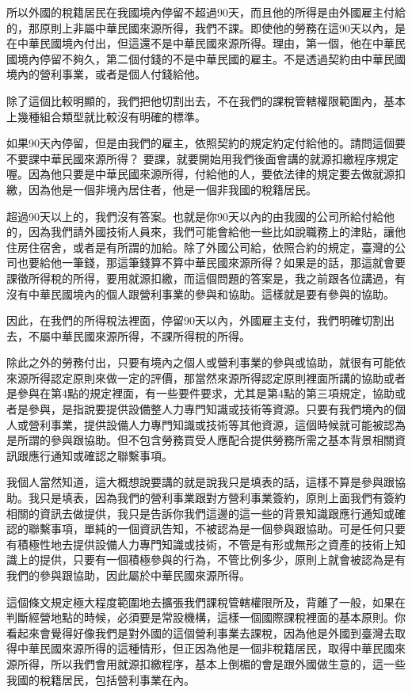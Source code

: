 \documentclass[oneside,sub3section]{ctexbook}
\begin{document}
所以外國的稅籍居民在我國境內停留不超過90天，而且他的所得是由外國雇主付給的，那原則上非屬中華民國來源所得，我們不課。即使他的勞務在這90天以內，是在中華民國境內付出，但這還不是中華民國來源所得。理由，第一個，他在中華民國境內停留不夠久，第二個付錢的不是中華民國的雇主。不是透過契約由中華民國境內的營利事業，或者是個人付錢給他。

除了這個比較明顯的，我們把他切割出去，不在我們的課稅管轄權限範圍內，基本上幾種組合類型就比較沒有明確的標準。

如果90天內停留，但是由我們的雇主，依照契約的規定約定付給他的。請問這個要不要課中華民國來源所得？ 要課，就要開始用我們後面會講的就源扣繳程序規定喔。因為他只要是中華民國來源所得，付給他的人，要依法律的規定要去做就源扣繳，因為他是一個非境內居住者，他是一個非我國的稅籍居民。

超過90天以上的，我們沒有答案。也就是你90天以內的由我國的公司所給付給他的，因為我們請外國技術人員來，我們可能會給他一些比如說職務上的津貼，讓他住房住宿舍，或者是有所謂的加給。除了外國公司給，依照合約的規定，臺灣的公司也要給他一筆錢，那這筆錢算不算中華民國來源所得？如果是的話，那這就會要課徵所得稅的所得，要用就源扣繳，而這個問題的答案是，我之前跟各位講過，有沒有中華民國境內的個人跟營利事業的參與和協助。這樣就是要有參與的協助。

因此，在我們的所得稅法裡面，停留90天以內，外國雇主支付，我們明確切割出去，不屬中華民國來源所得，不課所得稅的所得。

除此之外的勞務付出，只要有境內之個人或營利事業的參與或協助，就很有可能依來源所得認定原則來做一定的評價，那當然來源所得認定原則裡面所講的協助或者是參與在第4點的規定裡面，有一些要件要求，尤其是第4點的第三項規定，協助或者是參與，是指說要提供設備整人力專門知識或技術等資源。只要有我們境內的個人或營利事業，提供設備人力專門知識或技術等其他資源，這個時候就可能被認為是所謂的參與跟協助。但不包含勞務買受人應配合提供勞務所需之基本背景相關資訊跟應行通知或確認之聯繫事項。

我個人當然知道，這大概想說要講的就是說我只是填表的話，這樣不算是參與跟協助。我只是填表，因為我們的營利事業跟對方營利事業簽約，原則上面我們有簽約相關的資訊去做提供，我只是告訴你我們這邊的這一些的背景知識跟應行通知或確認的聯繫事項，單純的一個資訊告知，不被認為是一個參與跟協助。可是任何只要有積極性地去提供設備人力專門知識或技術，不管是有形或無形之資產的技術上知識上的提供，只要有一個積極參與的行為，不管比例多少，原則上就會被認為是有我們的參與跟協助，因此屬於中華民國來源所得。

這個條文規定極大程度範圍地去擴張我們課稅管轄權限所及，背離了一般，如果在判斷經營地點的時候，必須要是常設機構，這樣一個國際課稅裡面的基本原則。你看起來會覺得好像我們是對外國的這個營利事業去課稅，因為他是外國到臺灣去取得中華民國來源所得的這種情形，但正因為他是一個非稅籍居民，取得中華民國來源所得，所以我們會用就源扣繳程序，基本上倒楣的會是跟外國做生意的，這一些我國的稅籍居民，包括營利事業在內。
\end{document}
